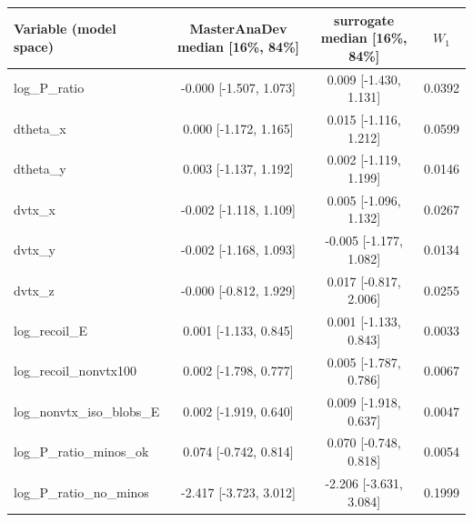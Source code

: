 \begin{tabular}{lccc}
\toprule
Variable (model space) & MasterAnaDev median [16\%, 84\%] & surrogate median [16\%, 84\%] & $W_1$ \\
\midrule
log\_P\_ratio & -0.000 [-1.507, 1.073] & 0.009 [-1.430, 1.131] & 0.0392 \\
dtheta\_x & 0.000 [-1.172, 1.165] & 0.015 [-1.116, 1.212] & 0.0599 \\
dtheta\_y & 0.003 [-1.137, 1.192] & 0.002 [-1.119, 1.199] & 0.0146 \\
dvtx\_x & -0.002 [-1.118, 1.109] & 0.005 [-1.096, 1.132] & 0.0267 \\
dvtx\_y & -0.002 [-1.168, 1.093] & -0.005 [-1.177, 1.082] & 0.0134 \\
dvtx\_z & -0.000 [-0.812, 1.929] & 0.017 [-0.817, 2.006] & 0.0255 \\
log\_recoil\_E & 0.001 [-1.133, 0.845] & 0.001 [-1.133, 0.843] & 0.0033 \\
log\_recoil\_nonvtx100 & 0.002 [-1.798, 0.777] & 0.005 [-1.787, 0.786] & 0.0067 \\
log\_nonvtx\_iso\_blobs\_E & 0.002 [-1.919, 0.640] & 0.009 [-1.918, 0.637] & 0.0047 \\
log\_P\_ratio\_minos\_ok & 0.074 [-0.742, 0.814] & 0.070 [-0.748, 0.818] & 0.0054 \\
log\_P\_ratio\_no\_minos & -2.417 [-3.723, 3.012] & -2.206 [-3.631, 3.084] & 0.1999 \\
\bottomrule
\end{tabular}
